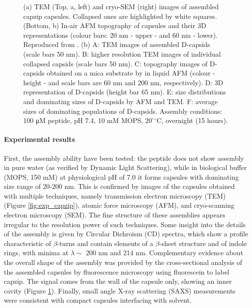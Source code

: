 \begin{figure}
\begin{center}
\caption[Experimental results on capzip: structure]{(a) TEM (Top, a, left) and cryo-SEM (right) images of assembled capzip capsules. Collapsed ones are highlighted by white squares. (Bottom, b) In-air AFM topography of capsules and their 3D representations (colour bars: 20 nm - upper - and 60 nm - lower). Reproduced from \citet{Castelletto2016}. (b) A: TEM images of assembled D-capsids (scale bars 50 nm). B: higher resolution TEM images of individual collapsed capsids (scale bars 50 nm). C: topography images of D-capsids obtained on a mica substrate by in liquid AFM (colour - height - and scale bars are 60 nm and 200 nm, respectively). D: 3D representation of D-capsids (height bar 65 nm). E: size distributions and dominating sizes of D-capsids by AFM and TEM. F: average sizes of dominating populations of D-capsids. Assembly conditions: 100 μM peptide, pH 7.4, 10 mM MOPS, 20 ̊$^{\circ}$C, overnight (15 hours).} \label{fig:exp_structure}
\end{center}
\end{figure}

\paragraph{Experimental results} First, the assembly ability have been tested: the peptide does not show assembly in pure water (as verified by Dynamic Light Scattering), while in biological buffer (MOPS, 150 mM) at physiological pH of 7.0 it forms capsules with dominating size range of 20-200 nm. This is confirmed by images of the capsules obtained with multiple techniques, namely transmission electron microscopy (TEM) (Figure \ref{fig:exp_capzip}), atomic force microscopy (AFM), and cryo-scanning electron microscopy (SEM).
%
The fine structure of these assemblies appears irregular to the resolution power of such techniques. Some insight into the details of the assembly is given by Circular Dichroism (CD) spectra, which show a profile characteristic of $\beta$-turns and contain elements of a $\beta$-sheet structure and of indole rings, with minima at $\lambda \sim$ 200 nm and 214 nm.
%
Complementary evidence about the overall shape of the assembly was provided by the cross-sectional analysis of the assembled capsules by fluorescence microscopy using fluorescein to label capzip. The signal comes from the wall of the capsule only, showing an inner cavity (Figure \ref{fig:exp_structure}).
%
Finally, small angle X-ray scattering (SAXS) measurements were consistent with compact capsules interfacing with solvent.

